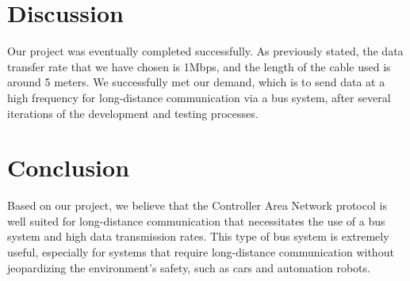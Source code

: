 
\section{Discussion}

Our project was eventually completed successfully. As previously stated, the data transfer rate that we have chosen is 1Mbps, and the length of the cable used is around 5 meters. We successfully met our demand, which is to send data at a high frequency for long-distance communication via a bus system, after several iterations of the development and testing processes.


\section{Conclusion}

Based on our project, we believe that the Controller Area Network protocol is well suited for long-distance communication that necessitates the use of a bus system and high data transmission rates. This type of bus system is extremely useful, especially for systems that require long-distance communication without jeopardizing the environment's safety, such as cars and automation robots.
